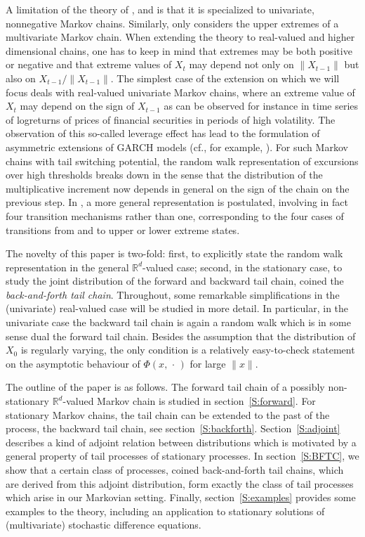 \documentclass{aptpubarxiv}
\numberwithin{equation}{section}
\begin{document}
A limitation of the theory of \citet{Smith92}, \citet{Perfekt94} and \citet{ReZe13} is that it is specialized to univariate, nonnegative Markov chains. Similarly, \citet{Perfekt97} only considers the upper extremes of a multivariate Markov chain. When extending the theory to real-valued and higher dimensional chains, one has to keep in mind that extremes may be both positive or negative and that extreme values of $X_t$ may depend not only on $\|X_{t-1}\|$ but also on $X_{t-1}/ \|X_{t-1}\|$. The simplest case of the extension on which we will focus deals with real-valued univariate Markov chains, where an extreme value of $X_t$ may depend on the sign of $X_{t-1}$ as can be observed for instance in time series of logreturns of prices of financial securities in periods of high volatility. The observation of this so-called leverage effect has lead to the formulation of asymmetric extensions of GARCH models (cf., for example, \cite{Zi09}). For such Markov chains with tail switching potential, the 
random walk representation of excursions over high thresholds breaks down in the sense that the distribution of the multiplicative increment now depends in general 
on the sign of the chain on the previous step. In \citet{BC03}, a more general representation is postulated, involving in fact four transition mechanisms rather than one, corresponding to the four cases of transitions from and to upper or lower extreme states.

The novelty of this paper is two-fold: first, to explicitly state the random walk representation in the general $\mathbb{R}^d$-valued case; second, in the stationary case, to study the joint distribution of the forward and backward tail chain, coined the {\em back-and-forth tail chain}. Throughout, some remarkable simplifications in the (univariate) real-valued case will be studied in more detail. In particular, in the univariate case the backward tail chain is again a random walk which is in some sense dual the forward tail chain. Besides the assumption that the distribution of $X_0$ is regularly varying, the only condition is a relatively easy-to-check statement on the asymptotic behaviour of $\Phi(x, \, \cdot \,)$ for large $\|x\|$.

The outline of the paper is as follows. The forward tail chain of a possibly non-stationary $\mathbb{R}^d$-valued Markov chain is studied in section~\ref{S:forward}. For stationary Markov chains, the tail chain can be extended to the past of the process, the backward tail chain, see section~\ref{S:backforth}. Section~\ref{S:adjoint} describes a kind of adjoint relation between distributions which is motivated by a general property of tail processes of stationary processes. In section~\ref{S:BFTC}, we show that a certain class of processes, coined back-and-forth tail chains, which are derived from this adjoint distribution, form exactly the class of tail processes which arise in our Markovian setting. Finally, section~\ref{S:examples} provides some examples to the theory, including an application to stationary solutions of (multivariate) stochastic difference equations.
\end{document}
